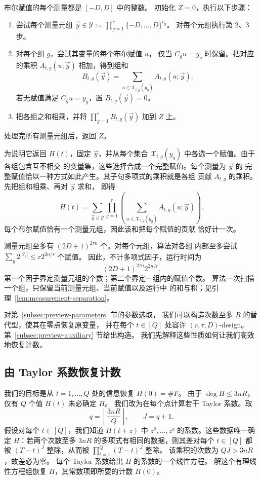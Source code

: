 \documentclass[11pt,reqno]{amsart}
\numberwithin{equation}{section}
\theoremstyle{definition}\newtheorem{definition}[theorem]{定义}
\theoremstyle{remark}\newtheorem{remark}[theorem]{注}
\renewcommand{\le}{\leqslant}
\begin{document}
布尔赋值的每个测量都是 $[-D,D]$ 中的整数。
初始化 $Z=0$，执行以下步骤：
\begin{enumerate}
\item 尝试每个测量元组
$\vec{y}\in\mathcal Y:=\prod_{g=1}^r\{-D,\ldots,D\}^{c_g}$。
对每个元组执行第 2、3 步。
\item 对每个组 $g$，尝试其变量的每个布尔赋值 $u$，
仅当 $C_gu=y_g$ 时保留。把对应的乘积 $A_{t,g}(u;\vec{y})$
相加，得到组和
\[
 B_{t,g}(\vec{y})=
 \sum_{u\in\mathcal X_{t,g}(y_g)}A_{t,g}(u;\vec{y}).
\]
若无赋值满足 $C_gu=y_g$，置 $B_{t,g}(\vec{y})=0$。
\item 把各组之和相乘，并将 $\prod_{g=1}^r B_{t,g}(\vec{y})$
加到 $Z$ 上。
\end{enumerate}
处理完所有测量元组后，返回 $Z$。

为说明它返回 $H(t)$，固定 $\vec{y}$，并从每个集合
$\mathcal X_{t,g}(y_g)$ 中各选一个赋值。由于各组包含互不相交
的变量集，这些选择合成一个完整赋值。每个测量为 $\vec{y}$ 的
完整赋值恰以一种方式如此产生。其子句多项式的乘积就是各组
贡献 $A_{t,g}$ 的乘积。先把组和相乘、再对 $\vec{y}$ 求和，
即得
\begin{equation}\label{eq:outline-separated-sum}
 H(t)=\sum_{\vec{y}\in\mathcal Y}\prod_{g=1}^r
       \left(\sum_{u\in\mathcal X_{t,g}(y_g)}
                         A_{t,g}(u;\vec{y})\right).
\end{equation}
每个布尔赋值恰有一个测量元组，因此该和把每个赋值的贡献
恰好计一次。

测量元组至多有 $(2D+1)^{2\tau n}$ 个。对每个元组，算法对各组
内部至多尝试 $\sum_g2^{|S_g|}\le r2^{2n/r}$ 个赋值。
因此，不计多项式因子，运行时间为
\[
 (2D+1)^{2\tau n}2^{2n/r}.
\]
第一个因子界定测量元组的个数；第二个界定一组内的赋值个数。
算法一次扫描一个组，只保留当前测量元组、当前赋值以及运行中
的和与积；见引理~\ref{lem:measurement-separation}。

对第~\ref{subsec:preview-parameters} 节的参数选取，
我们可以构造次数至多 $R$ 的替代型，使其在零点恢复原变量，
并在每个 $t\in[Q]$ 处容许 $(r,\tau,D)$-design。
第~\ref{subsec:preview-auxiliary} 节给出构造。
我们先解释这些性质如何让我们高效地恢复计数。

\subsection{由 Taylor 系数恢复计数}
\label{subsec:preview-interpolation}
我们的目标是从 $t=1,\ldots,Q$ 处的信息恢复 $H(0)=\#F$。
由于 $\deg H\le3nR$，仅有 $Q$ 个值 $H(t)$ 未必确定 $H$。
我们改为在每个点计算若干 Taylor 系数。取
\[
 q=\left\lfloor\frac{3nR}{Q}\right\rfloor,\qquad J=q+1.
\]
假设对每个 $t\in[Q]$，我们知道 $H(t+z)$ 中 $z^0,\ldots,z^q$
的系数。这些数据唯一确定 $H$：若两个次数至多 $3nR$
的多项式有相同的数据，则其差对每个 $t\in[Q]$ 都被
$(T-t)^J$ 整除，从而被 $\prod_{t=1}^Q(T-t)^J$ 整除。
该乘积的次数为 $QJ>3nR$，故差必为零。
每个 Taylor 系数给出 $H$ 的系数的一个线性方程。
解这个有理线性方程组恢复 $H$，其常数项即所要的计数 $H(0)$。
\end{document}
